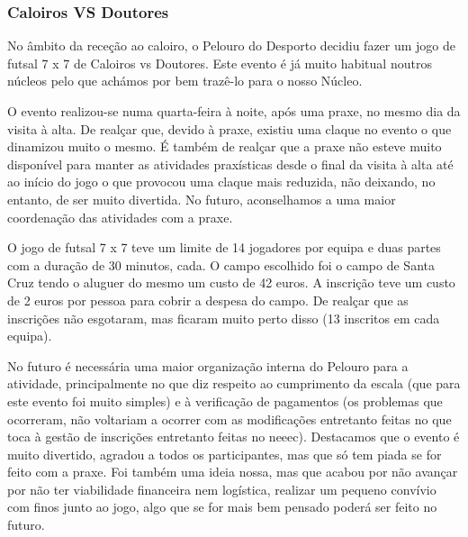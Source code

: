 
\subsubsection{Caloiros VS Doutores}

No âmbito da receção ao caloiro, o Pelouro do Desporto decidiu fazer um jogo de futsal 7 x 7 de Caloiros vs Doutores. Este evento é já muito habitual noutros núcleos pelo que achámos por bem trazê-lo para o nosso Núcleo.

O evento realizou-se numa quarta-feira à noite, após uma praxe, no mesmo dia da visita à alta. De realçar que, devido à praxe, existiu uma claque no evento o que dinamizou muito o mesmo. É também de realçar que a praxe não esteve muito disponível para manter as atividades praxísticas desde o final da visita à alta até ao início do jogo o que provocou uma claque mais reduzida, não deixando, no entanto, de ser muito divertida. No futuro, aconselhamos a uma maior coordenação das atividades com a praxe.

O jogo de futsal 7 x 7 teve um limite de 14 jogadores por equipa e duas partes com a duração de 30 minutos, cada. O campo escolhido foi o campo de Santa Cruz tendo o aluguer do mesmo um custo de 42 euros. A inscrição teve um custo de 2 euros por pessoa para cobrir a despesa do campo. De realçar que as inscrições não esgotaram, mas ficaram muito perto disso (13 inscritos em cada equipa).

No futuro é necessária uma maior organização interna do Pelouro para a atividade, principalmente no que diz respeito ao cumprimento da escala (que para este evento foi muito simples) e à verificação de pagamentos (os problemas que ocorreram, não voltariam a ocorrer com as modificações entretanto feitas no que toca à gestão de inscrições entretanto feitas no \acrshort{neeec}). Destacamos que o evento é muito divertido, agradou a todos os participantes, mas que só tem piada se for feito com a praxe. Foi também uma ideia nossa, mas que acabou por não avançar por não ter viabilidade financeira nem logística, realizar um pequeno convívio com finos junto ao jogo, algo que se for mais bem pensado poderá ser feito no futuro.
